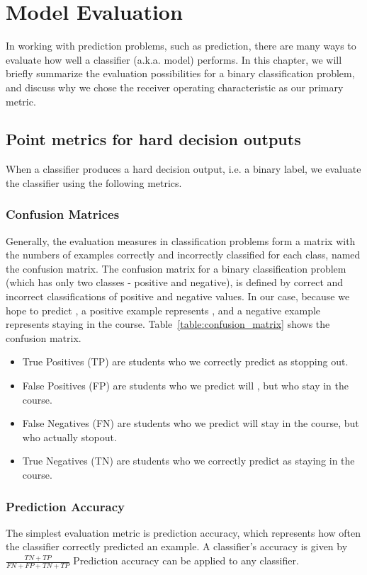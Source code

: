 \chapter{Model Evaluation}\label{chap:evaluation}
In working with prediction problems, such as \sti prediction, there are many ways to evaluate how well a classifier (a.k.a. model) performs. In this chapter, we will briefly summarize the evaluation possibilities for a binary classification problem, and discuss why we chose the receiver operating characteristic as our primary metric.

\section{Point metrics for hard decision outputs}
When a classifier produces a hard decision output, i.e. a binary label, we evaluate the classifier using the following metrics.

\subsection{Confusion Matrices}
Generally, the evaluation measures in classification problems form a matrix with the numbers of examples correctly and incorrectly classified for each class, named the confusion matrix. The confusion matrix for a binary classification problem (which has only two classes - positive and negative), is defined by correct and incorrect classifications of positive and negative values. In our case, because we hope to predict \sti, a positive example represents \sti, and a negative example represents staying in the course. Table~\ref{table:confusion_matrix} shows the confusion matrix.


\begin{itemize}
\item True Positives (TP) are students who we correctly predict as stopping out.
\item False Positives (FP) are students who we predict will \sti, but who stay in the course.
\item False Negatives (FN) are students who we predict will stay in the course, but who actually stopout.
\item True Negatives (TN) are students who we correctly predict as staying in the course.
\end{itemize}

\subsection{Prediction Accuracy}
The simplest evaluation metric is prediction accuracy, which represents how often the classifier correctly predicted an example. A classifier's accuracy is given by $\frac{TN + TP}{FN + FP + TN + TP}$ Prediction accuracy can be applied to any classifier.

